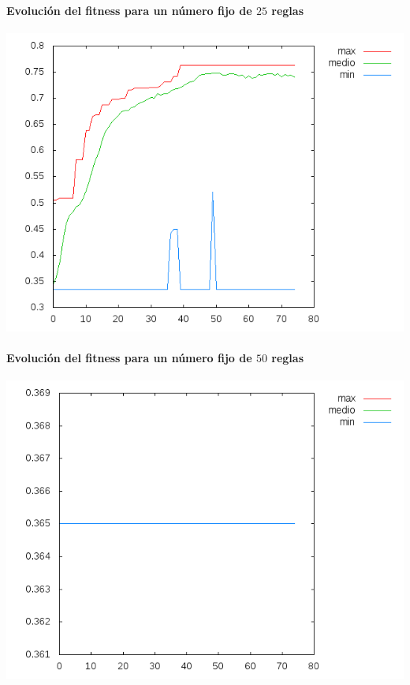 \documentclass[nochap]{apuntes}
\begin{document}
\paragraph{Evolución del fitness para un número fijo de $25$ reglas}
\begin{center}
\includegraphics[scale=0.6]{tex/img/g75_p75_MejoresPorPeores_SeleccionProporcionalAlFitness_reg25.png}
\end{center}
\paragraph{Evolución del fitness para un número fijo de $50$ reglas}
\begin{center}
\includegraphics[scale=0.6]{tex/img/g75_p75_MejoresPorPeores_SeleccionProporcionalAlFitness_reg50.png}
\end{center}
\end{document}
